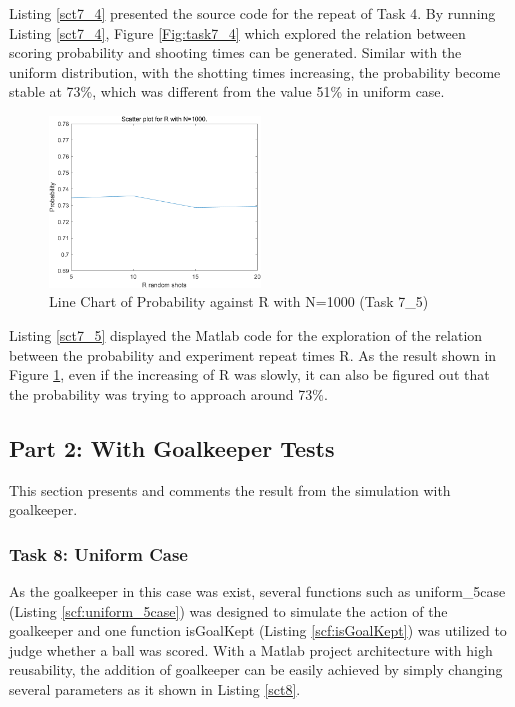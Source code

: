 \documentclass[11pt, a4paper]{article}
\begin{document}
Listing \ref{sct7_4} presented the source code for the repeat of Task 4. By running Listing \ref{sct7_4}, Figure \ref{Fig:task7_4} which explored the relation between scoring probability and shooting times can be generated. Similar with the uniform distribution, with the shotting times increasing, the probability become stable at 73\%, which was different from the value 51\% in uniform case.

\begin{figure}[htbp]     \begin{centering}
    \includegraphics[width=0.5\textwidth]{img/t7_5.png}
    \caption{Line Chart of Probability against R with N=1000 (Task 7\_5)}
    \label{Fig:task7_5}
    \end{centering}
\end{figure}

Listing \ref{sct7_5} displayed the Matlab code for the exploration of the relation between the probability and experiment repeat times R. As the result shown in Figure \ref{Fig:task7_5}, even if the increasing of R was slowly, it can also be figured out that the probability was trying to approach around 73\%.



\subsection{Part 2: With Goalkeeper Tests}

This section presents and comments the result from the simulation with goalkeeper.

\subsubsection{Task 8: Uniform Case}

As the goalkeeper in this case was exist, several functions such as uniform\_5case (Listing \ref{scf:uniform_5case}) was designed to simulate the action of the goalkeeper and one function isGoalKept (Listing \ref{scf:isGoalKept}) was utilized to judge whether a ball was scored. With a Matlab project architecture with high reusability, the addition of goalkeeper can be easily achieved by simply changing several parameters as it shown in Listing \ref{sct8}.
\end{document}
